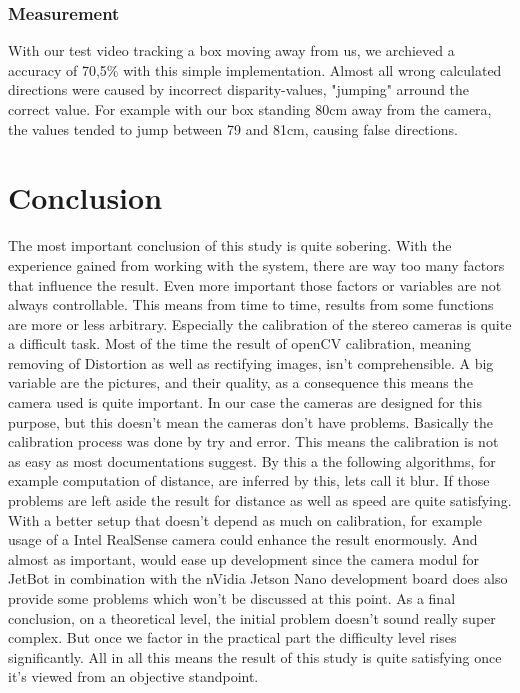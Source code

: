 \documentclass[journal,onecolumn]{IEEEtran}
\begin{document}
\subsubsection{Measurement}
\noindent With our test video tracking a box moving away from us, we archieved a accuracy of 70,5\% with this simple implementation. Almost all wrong calculated directions were caused by incorrect disparity-values, "jumping" arround the correct value. For example with our box standing 80cm away from the camera, the values tended to jump between 79 and 81cm, causing false directions. 

 
\section{Conclusion}
\noindent The most important conclusion of this study is quite sobering. With the experience gained from working with the system, there are way too many factors that influence the result. Even more important those factors or variables are not always controllable. This means from time to time, results from some functions are more or less arbitrary. Especially the calibration of the stereo cameras is quite a difficult task. Most of the time the result of openCV calibration, meaning removing of Distortion as well as rectifying images, isn't comprehensible. A big variable are the pictures, and their quality, as a consequence this means the camera used is quite important. In our case the cameras are designed for this purpose, but this doesn't mean the cameras don't have problems. Basically the calibration process was done by try and error. This means the calibration is not as easy as most documentations suggest. By this a the following algorithms, for example computation of distance, are inferred by this, lets call it blur. \newline
If those problems are left aside the result for distance as well as speed are quite satisfying. With a better setup that doesn't depend as much on calibration, for example usage of a Intel RealSense camera could enhance the result enormously. And almost as important, would ease up development since the camera modul for JetBot in combination with the nVidia Jetson Nano development board does also provide some problems which won't be discussed at this point. \newline
As a final conclusion, on a theoretical level, the initial problem doesn't sound really super complex. But once we factor in the practical part the difficulty level rises significantly. All in all this means the result of this study is quite satisfying once it's viewed from an objective standpoint.
\appendices
\end{document}
